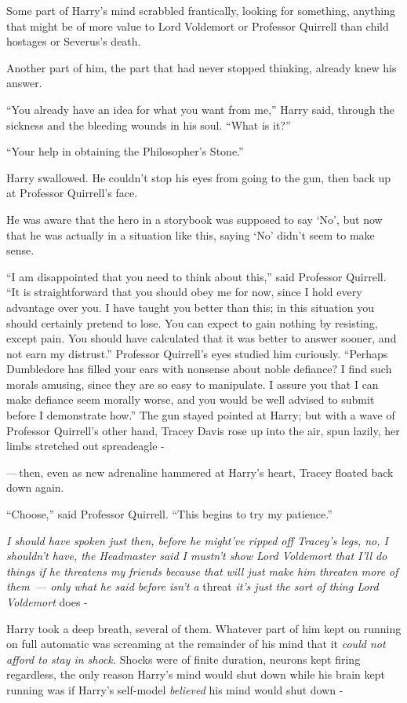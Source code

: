 Some part of Harry's mind scrabbled frantically, looking for something, anything that might be of more value to Lord Voldemort or Professor Quirrell than child hostages or Severus's death.

Another part of him, the part that had never stopped thinking, already knew his answer.

``You already have an idea for what you want from me,'' Harry said, through the sickness and the bleeding wounds in his soul. ``What is it?''

``Your help in obtaining the Philosopher's Stone.''

Harry swallowed. He couldn't stop his eyes from going to the gun, then back up at Professor Quirrell's face.

He was aware that the hero in a storybook was supposed to say `No', but now that he was actually in a situation like this, saying `No' didn't seem to make sense.

``I am disappointed that you need to think about this,'' said Professor Quirrell. ``It is straightforward that you should obey me for now, since I hold every advantage over you. I have taught you better than this; in this situation you should certainly pretend to lose. You can expect to gain nothing by resisting, except pain. You should have calculated that it was better to answer sooner, and not earn my distrust.'' Professor Quirrell's eyes studied him curiously. ``Perhaps Dumbledore has filled your ears with nonsense about noble defiance? I find such morals amusing, since they are so easy to manipulate. I assure you that I can make defiance seem morally worse, and you would be well advised to submit before I demonstrate how.'' The gun stayed pointed at Harry; but with a wave of Professor Quirrell's other hand, Tracey Davis rose up into the air, spun lazily, her limbs stretched out spreadeagle -

---\,then, even as new adrenaline hammered at Harry's heart, Tracey floated back down again.

``Choose,'' said Professor Quirrell. ``This begins to try my patience.''

\emph{I should have spoken just then, before he might've ripped off Tracey's legs, no, I shouldn't have, the Headmaster said I mustn't show Lord Voldemort that I'll do things if he threatens my friends because that will just make him threaten more of them~--- only what he said before isn't a} threat \emph{it's just the sort of thing Lord Voldemort} does -

Harry took a deep breath, several of them. Whatever part of him kept on running on full automatic was screaming at the remainder of his mind that it \emph{could not afford to stay in shock.} Shocks were of finite duration, neurons kept firing regardless, the only reason Harry's mind would shut down while his brain kept running was if Harry's self-model \emph{believed} his mind would shut down -

